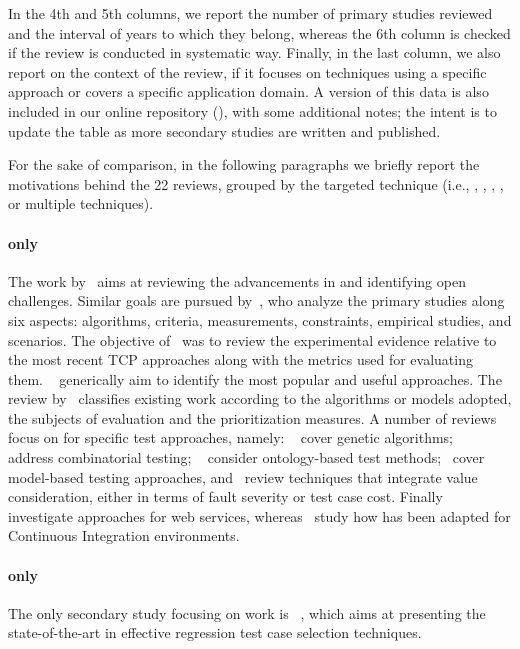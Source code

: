 In the 4th and 5th columns, we report the number of primary studies reviewed and the interval of years to which they belong, whereas the 6th column is checked if the review is conducted in systematic way. 
Finally, in the last column, we also report on the context of the review, if it focuses on techniques using a specific approach or covers a specific application domain.
A version of this data is also included in our online repository (), with some additional notes; the intent is to update the table as more secondary studies are written and published.

For the sake of comparison, in the following paragraphs we briefly report the motivations behind the 22 reviews, 
grouped by the targeted technique (i.e., \tcp, \tcs, \tsr, \tsa, or multiple techniques).

\paragraph{\tcp only}The work by~\citet{hao_test-case_2016} aims at reviewing the advancements in \tcp and  identifying open challenges. 
Similar goals are pursued by~\citet{lou_survey_2018}, who analyze the primary studies along six aspects: algorithms, criteria, measurements, constraints, empirical studies, and scenarios.
The objective of~\citet{khatibsyarbini_test_2018} was to review the experimental evidence relative to the most recent TCP approaches along with the metrics used for evaluating them. 
~\citet{mukherjee_survey_2018} generically aim to identify the most popular and useful \tcp approaches.
The review by~\citet{samad2021regression} classifies existing work according to the algorithms or models adopted, the subjects of evaluation and the prioritization measures.
A number of reviews focus on \tcp for specific test approaches, namely: ~\citet{bajaj_systematic_2019} 
cover genetic algorithms; ~\citet{abdul2021systematic} address combinatorial testing; ~\citet{hasnain2021ontology} consider ontology-based test methods;~\citet{mohd2021model} cover model-based testing approaches, and~\citet{ahmed_value_2022} review \tcp techniques that  integrate value consideration, either in terms of fault severity or test case cost.
Finally~\citet{hasnain_comprehensive_2020} investigate \tcp approaches for web services, 
whereas~\citet{prado_lima_test_2020} study how \tcp has been adapted for Continuous Integration environments.
 

\paragraph{\tcs only} The only secondary study focusing on \tcs work is ~\citet{kazmi_effective_2017}, which aims at presenting the state-of-the-art in effective regression test case selection techniques.


